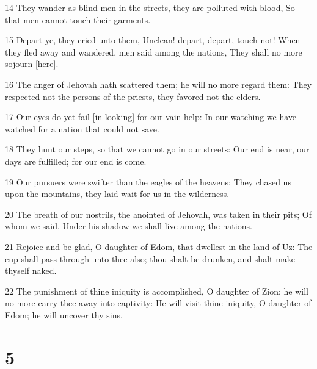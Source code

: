 \par 14 They wander as blind men in the streets, they are polluted with blood, So that men cannot touch their garments.
\par 15 Depart ye, they cried unto them, Unclean! depart, depart, touch not! When they fled away and wandered, men said among the nations, They shall no more sojourn [here].
\par 16 The anger of Jehovah hath scattered them; he will no more regard them: They respected not the persons of the priests, they favored not the elders.
\par 17 Our eyes do yet fail [in looking] for our vain help: In our watching we have watched for a nation that could not save.
\par 18 They hunt our steps, so that we cannot go in our streets: Our end is near, our days are fulfilled; for our end is come.
\par 19 Our pursuers were swifter than the eagles of the heavens: They chased us upon the mountains, they laid wait for us in the wilderness.
\par 20 The breath of our nostrils, the anointed of Jehovah, was taken in their pits; Of whom we said, Under his shadow we shall live among the nations.
\par 21 Rejoice and be glad, O daughter of Edom, that dwellest in the land of Uz: The cup shall pass through unto thee also; thou shalt be drunken, and shalt make thyself naked.
\par 22 The punishment of thine iniquity is accomplished, O daughter of Zion; he will no more carry thee away into captivity: He will visit thine iniquity, O daughter of Edom; he will uncover thy sins.

\chapter{5}

